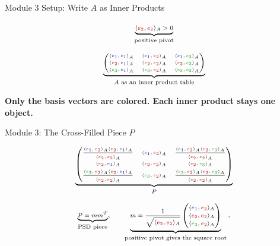 \documentclass[10pt]{beamer}
\theoremstyle{definition}
\newcommand{\x}[1]{\alert{\textbf{#1}}}
\newcommand{\rd}[1]{{\color{red!70!black}#1}}
\newcommand{\bl}[1]{{\color{blue!70!black}#1}}
\newcommand{\gn}[1]{{\color{green!60!black}#1}}
\begin{document}
\begin{frame}[shrink=8]{Module 3 Setup: Write $A$ as Inner Products}

\[
\scriptsize
\underbrace{\langle \rd{e_2},\rd{e_2}\rangle_A>0}_{\text{positive pivot}}
\]

\vfill

\[
\tiny
\underbrace{
\begin{pmatrix}
\langle \bl{e_1},\bl{e_1}\rangle_A&\langle \bl{e_1},\rd{e_2}\rangle_A&\langle \bl{e_1},\gn{e_3}\rangle_A\\[0.35em]
\langle \rd{e_2},\bl{e_1}\rangle_A&\langle \rd{e_2},\rd{e_2}\rangle_A&\langle \rd{e_2},\gn{e_3}\rangle_A\\[0.35em]
\langle \gn{e_3},\bl{e_1}\rangle_A&\langle \gn{e_3},\rd{e_2}\rangle_A&\langle \gn{e_3},\gn{e_3}\rangle_A
\end{pmatrix}}_{A\text{ as an inner product table}}
\]

\vfill

\begin{center}
\x{Only the basis vectors are colored. Each inner product stays one object.}
\end{center}

\end{frame}


\begin{frame}[shrink=8]{Module 3: The Cross-Filled Piece $P$}

\[
\tiny
\underbrace{
\begin{pmatrix}
\dfrac{\langle \bl{e_1},\rd{e_2}\rangle_A\langle \rd{e_2},\bl{e_1}\rangle_A}{\langle \rd{e_2},\rd{e_2}\rangle_A}
&
\langle \bl{e_1},\rd{e_2}\rangle_A
&
\dfrac{\langle \bl{e_1},\rd{e_2}\rangle_A\langle \rd{e_2},\gn{e_3}\rangle_A}{\langle \rd{e_2},\rd{e_2}\rangle_A}
\\[1.05em]
\langle \rd{e_2},\bl{e_1}\rangle_A
&
\langle \rd{e_2},\rd{e_2}\rangle_A
&
\langle \rd{e_2},\gn{e_3}\rangle_A
\\[0.6em]
\dfrac{\langle \gn{e_3},\rd{e_2}\rangle_A\langle \rd{e_2},\bl{e_1}\rangle_A}{\langle \rd{e_2},\rd{e_2}\rangle_A}
&
\langle \gn{e_3},\rd{e_2}\rangle_A
&
\dfrac{\langle \gn{e_3},\rd{e_2}\rangle_A\langle \rd{e_2},\gn{e_3}\rangle_A}{\langle \rd{e_2},\rd{e_2}\rangle_A}
\end{pmatrix}}_{P}
\]

\vfill

\[
\scriptsize
\underbrace{P=mm^T}_{\text{PSD piece}},
\qquad
\underbrace{m=\frac1{\sqrt{\langle \rd{e_2},\rd{e_2}\rangle_A}}
\begin{pmatrix}
\langle \bl{e_1},\rd{e_2}\rangle_A\\[0.2em]
\langle \rd{e_2},\rd{e_2}\rangle_A\\[0.2em]
\langle \gn{e_3},\rd{e_2}\rangle_A
\end{pmatrix}}_{\text{positive pivot gives the square root}}.
\]

\end{frame}
\end{document}
